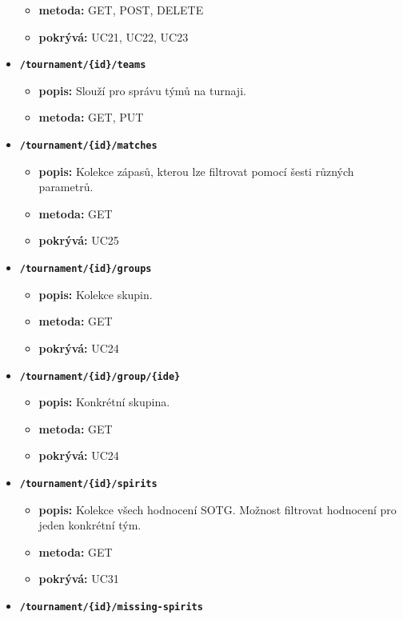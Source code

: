 \begin{itemize}
\begin{itemize}
    \item \textbf{metoda:} GET, POST, DELETE
    \item \textbf{pokrývá:} UC21, UC22, UC23
  \end{itemize}
  \item \texttt{\textbf{/tournament/\{id\}/teams}}
  \begin{itemize}
    \item \textbf{popis:} Slouží pro správu týmů na turnaji.
    \item \textbf{metoda:} GET, PUT
  \end{itemize}
  \item \texttt{\textbf{/tournament/\{id\}/matches}}
  \begin{itemize}
    \item \textbf{popis:} Kolekce zápasů, kterou lze filtrovat pomocí šesti různých parametrů.
    \item \textbf{metoda:} GET
    \item \textbf{pokrývá:} UC25\\
  \end{itemize}
  \item \texttt{\textbf{/tournament/\{id\}/groups}}
  \begin{itemize}
    \item \textbf{popis:} Kolekce skupin.
    \item \textbf{metoda:} GET
    \item \textbf{pokrývá:} UC24
  \end{itemize}
  \item \texttt{\textbf{/tournament/\{id\}/group/\{ide\}}}
  \begin{itemize}
    \item \textbf{popis:} Konkrétní skupina.
    \item \textbf{metoda:} GET
    \item \textbf{pokrývá:} UC24
  \end{itemize}
  \item \texttt{\textbf{/tournament/\{id\}/spirits}}
  \begin{itemize}
    \item \textbf{popis:} Kolekce všech hodnocení SOTG. Možnost filtrovat hodnocení pro jeden konkrétní tým.
    \item \textbf{metoda:} GET
    \item \textbf{pokrývá:} UC31
  \end{itemize}
  \item \texttt{\textbf{/tournament/\{id\}/missing-spirits}}

\end{itemize}
